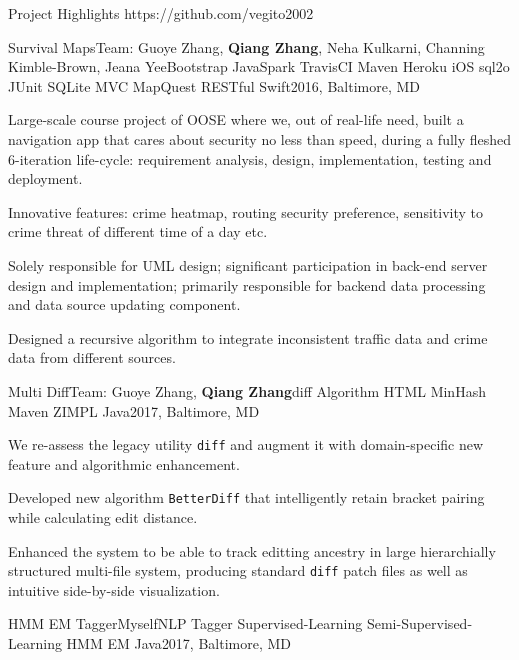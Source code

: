 \documentclass{resume} %
\begin{document}
\begin{rSection}{Project Highlights \faGithub\hspace{0.1cm} https://github.com/vegito2002}

\begin{rSubsection}{Survival Maps}{Team: Guoye Zhang, {\bf Qiang Zhang}, Neha Kulkarni, Channing Kimble-Brown, Jeana Yee}{Bootstrap JavaSpark TravisCI Maven Heroku iOS sql2o JUnit SQLite MVC MapQuest RESTful Swift}{2016, Baltimore, MD}
\item Large-scale course project of OOSE where we, out of real-life need, built a navigation app that cares about security no less than speed, during a fully fleshed 6-iteration life-cycle: requirement analysis, design, implementation, testing and deployment.
\item Innovative features: crime heatmap, routing security preference, sensitivity to crime threat of different time of a day etc.
\item Solely responsible for UML design; significant participation in back-end server design and implementation; primarily responsible for backend data processing and data source updating component.
\item Designed a recursive algorithm to integrate inconsistent traffic data and crime data from different sources.
\end{rSubsection}
\begin{rSubsection}{Multi Diff}{Team: Guoye Zhang, {\bf Qiang Zhang}}{diff Algorithm HTML MinHash Maven ZIMPL Java}{2017, Baltimore, MD}
\item We re-assess the legacy utility \texttt{diff} and augment it with domain-specific new feature and algorithmic enhancement.
\item Developed new algorithm \texttt{BetterDiff} that intelligently retain bracket pairing while calculating edit distance.
\item Enhanced the system to be able to track editting ancestry in large hierarchially structured multi-file system, producing standard \texttt{diff} patch files as well as intuitive side-by-side visualization.
\end{rSubsection}
\begin{rSubsection}{HMM EM Tagger}{Myself}{NLP Tagger Supervised-Learning Semi-Supervised-Learning HMM EM Java}{2017, Baltimore, MD}

\end{rSubsection}
\end{rSection}
\end{document}
